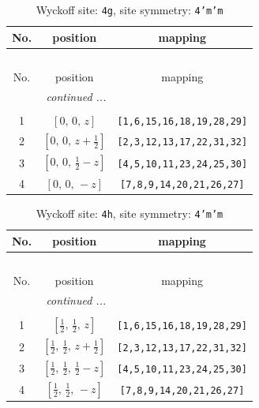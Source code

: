 \documentclass[fleqn,8pt]{jsarticle}
\begin{document}
\renewcommand{\arraystretch}{1.2}
\begin{longtable}{ccc}
\caption{Wyckoff site: {\tt 4g}, site symmetry: {\tt 4'm'm}}
 \\
 \hline \hline
No. & position & mapping \\ \hline \endfirsthead

\multicolumn{2}{l}{\tablename\ \thetable{}} \\
 \hline \hline
No. & position & mapping \\ \hline \endhead

 \hline \hline
\multicolumn{2}{r}{\footnotesize\it continued ...} \\ \endfoot

 \hline \hline
\multicolumn{2}{r}{} \\ \endlastfoot

1 & $\left[ 0,\, 0,\, z \right]$ & {\tt [1,6,15,16,18,19,28,29]} \\ \hline
2 & $\left[ 0,\, 0,\, z + \frac{1}{2} \right]$ & {\tt [2,3,12,13,17,22,31,32]} \\ \hline
3 & $\left[ 0,\, 0,\, \frac{1}{2} - z \right]$ & {\tt [4,5,10,11,23,24,25,30]} \\ \hline
4 & $\left[ 0,\, 0,\, - z \right]$ & {\tt [7,8,9,14,20,21,26,27]} \\
\end{longtable}
\renewcommand{\arraystretch}{1.2}
\begin{longtable}{ccc}
\caption{Wyckoff site: {\tt 4h}, site symmetry: {\tt 4'm'm}}
 \\
 \hline \hline
No. & position & mapping \\ \hline \endfirsthead

\multicolumn{2}{l}{\tablename\ \thetable{}} \\
 \hline \hline
No. & position & mapping \\ \hline \endhead

 \hline \hline
\multicolumn{2}{r}{\footnotesize\it continued ...} \\ \endfoot

 \hline \hline
\multicolumn{2}{r}{} \\ \endlastfoot

1 & $\left[ \frac{1}{2},\, \frac{1}{2},\, z \right]$ & {\tt [1,6,15,16,18,19,28,29]} \\ \hline
2 & $\left[ \frac{1}{2},\, \frac{1}{2},\, z + \frac{1}{2} \right]$ & {\tt [2,3,12,13,17,22,31,32]} \\ \hline
3 & $\left[ \frac{1}{2},\, \frac{1}{2},\, \frac{1}{2} - z \right]$ & {\tt [4,5,10,11,23,24,25,30]} \\ \hline
4 & $\left[ \frac{1}{2},\, \frac{1}{2},\, - z \right]$ & {\tt [7,8,9,14,20,21,26,27]} \\
\end{longtable}
\end{document}

